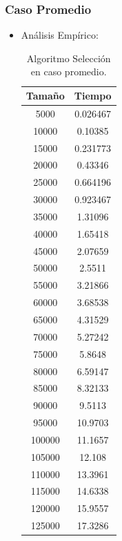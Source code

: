 \documentclass[a4paper,12pt,twoside]{article} %
\begin{document}
\begin{itemize}
\begin{figure}[h]
\begin{center}
  \end{center}
\end{figure}
		
		
	\end{itemize}
	
\newpage
	
	\subsubsection{Caso Promedio}
	
	\begin{itemize}
	
		\item Análisis Empírico:
		
		\begin{table}[h]
	\begin{center}
		\begin{tabular}{|c|c|}
		\hline
		Tamaño & Tiempo \\
		\hline
		5000 & 0.026467 \\
		10000 & 0.10385 \\
		15000 & 0.231773 \\
		20000 & 0.43346 \\
		25000 & 0.664196 \\
		30000 & 0.923467 \\
		35000 & 1.31096 \\
		40000 & 1.65418 \\
		45000 & 2.07659 \\
		50000 & 2.5511 \\
		55000 & 3.21866 \\
		60000 & 3.68538 \\
		65000 & 4.31529 \\
		70000 & 5.27242 \\
		75000 & 5.8648 \\
		80000 & 6.59147 \\
		85000 & 8.32133 \\
		90000 & 9.5113 \\
		95000 & 10.9703 \\
		100000 & 11.1657 \\
		105000 & 12.108 \\
		110000 & 13.3961 \\
		115000 & 14.6338 \\
		120000 & 15.9557 \\
		125000 & 17.3286 \\
		\hline
		\end{tabular}
	\end{center}
	\caption{Algoritmo Selección en caso promedio.}
\end{table}
\newpage
		

\end{itemize}
\end{document}
